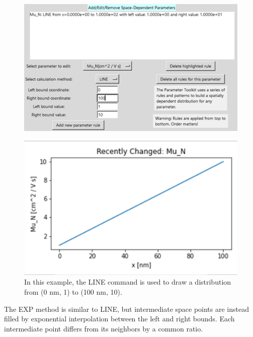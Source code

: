 \documentclass[11pt,letterpaper,titlepage]{article}
\begin{document}
		\begin{figure}[H]
			\label{fig:ptoolkit_line}
			\centering
			\includegraphics[scale=1]{"ptoolkit_line"}
		\end{figure}
		\begin{figure}[H]
			\label{fig:ptoolkit_line_plot}
			\centering
			\includegraphics[scale=1]{"ptoolkit_line_plot"}
			\caption{In this example, the LINE command is used to draw a distribution from (0 nm, 1) to (100 nm, 10).}
		\end{figure}
		
		\par The EXP method is similar to LINE, but intermediate space points are instead filled by exponential interpolation between the left and right bounds. Each intermediate point differs from its neighbors by a common ratio.
		
\end{document}
